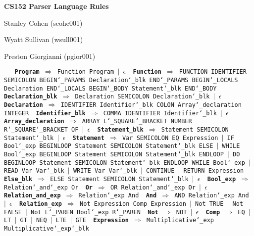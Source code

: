 \documentclass{article}
\begin{document}
 
 
\centerline{\large \bf CS152 Parser Language Rules}
\centerline{Stanley Cohen (scohe001)}
\centerline{Wyatt Sullivan (wsull001)}
\centerline{Preston Giorgianni (pgior001)}

\texttt{
\
{\vskip 0.1in \noindent\bf Program} $\Rightarrow$ 
        Function Program $|$ $\epsilon$
{\vskip 0.1in \noindent\bf Function} $\Rightarrow$ 
        FUNCTION IDENTIFIER SEMICOLON BEGIN\char`_PARAMS Declaration\char`_blk 
        END\char`_PARAMS BEGIN\char`_LOCALS Declaration END\char`_LOCALS BEGIN\char`_BODY 
        Statement\char`_blk END\char`_BODY
\
{\vskip 0.1in \noindent\bf Declaration\_blk} $\Rightarrow$ 
    Declaration SEMICOLON Declaration\char`_blk $|$ $\epsilon$
{\vskip 0.1in \noindent\bf Declaration} $\Rightarrow$ 
    IDENTIFIER Identifier\char`_blk COLON Array\char`_declaration INTEGER
{\vskip 0.1in \noindent\bf Identifier\_blk} $\Rightarrow$ 
    COMMA IDENTIFIER Identifier\char`_blk $|$ $\epsilon$
{\vskip 0.1in \noindent\bf Array\_declaration} $\Rightarrow$ 
    ARRAY L\char`_SQUARE\char`_BRACKET NUMBER R\char`_SQUARE\char`_BRACKET OF $|$ $\epsilon$
{\vskip 0.1in \noindent\bf Statement\_blk} $\Rightarrow$ 
    Statement SEMICOLON Statement\char`_blk $|$ $\epsilon$
{\vskip 0.1in \noindent\bf Statement} $\Rightarrow$ 
    Var SEMICOLON EQ Expression $|$ IF Bool\char`_exp BEGINLOOP Statement SEMICOLON Statement\char`_blk ELSE $|$ WHILE Bool\char`_exp BEGINLOOP Statement SEMICOLON Statement\char`_blk ENDLOOP $|$ DO BEGINLOOP Statement SEMICOLON Statement\char`_blk ENDLOOP WHILE Bool\char`_exp $|$ READ Var Var\char`_blk $|$ WRITE Var Var\char`_blk $|$ CONTINUE $|$ RETURN Expression
{\vskip 0.1in \noindent\bf Else\_blk} $\Rightarrow$ 
    ELSE Statement SEMICOLON Statement\char`_blk $|$ $\epsilon$
{\vskip 0.1in \noindent\bf Bool\_exp} $\Rightarrow$ 
    Relation\char`_and\char`_exp Or
{\vskip 0.1in \noindent\bf Or} $\Rightarrow$ 
    OR Relation\char`_and\char`_exp Or $|$ $\epsilon$
{\vskip 0.1in \noindent\bf Relation\_and\_exp} $\Rightarrow$ 
    Relation\char`_exp And
{\vskip 0.1in \noindent\bf And} $\Rightarrow$ 
    AND Relation\char`_exp And $|$ $\epsilon$
{\vskip 0.1in \noindent\bf Relation\_exp} $\Rightarrow$ 
    Not Expression Comp Expression $|$ Not TRUE $|$ Not FALSE $|$ Not L\char`_PAREN Bool\char`_exp R\char`_PAREN
{\vskip 0.1in \noindent\bf Not} $\Rightarrow$ 
    NOT $|$ $\epsilon$
{\vskip 0.1in \noindent\bf Comp} $\Rightarrow$ 
    EQ $|$ LT $|$ GT $|$ NEQ $|$ LTE $|$ GTE
{\vskip 0.1in \noindent\bf Expression} $\Rightarrow$ 
    Multiplicative\char`_exp Multiplicative\char`_exp\char`_blk
}
\end{document}
